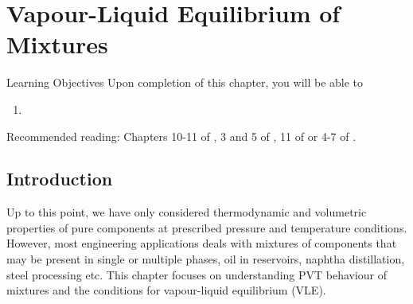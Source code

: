 \chapter{Vapour-Liquid Equilibrium of Mixtures}\label{Chapter:VLE}


   \begin{LearningObjectivesBlock}{Learning Objectives}
      Upon completion of this chapter, you will be able to
        \begin{enumerate}
           \item 
        \end{enumerate}
\medskip
     Recommended reading: Chapters 10-11 of \citet{SmithVanNess_Book}, 3 and 5 of \citet{Lue_Book}, 11 of \citet{Moran_Book} or 4-7 of \citet{Atkins_Book}.
   \end{LearningObjectivesBlock}


\begin{comment}
   \begin{LearningObjectivesBlock}{Learning Objectives}
      Upon completion of this chapter, you will be able to
        \begin{enumerate}
           \item {\bf Knowledge:} Define, Name, Select, State 
           \item {\bf Comprehension:} Describe, Identify, Discuss
           \item {\bf Application:} Apply, Demonstrate, Employ, Sketch
           \item {\bf Analysis:} Analyse, Compare, Calculate, Solve
           \item {\bf Synthesis:} Determine, Formulate
           \item {\bf Evaluation:} Assess, Check, Estimate, Compare, Measure, Monitor
        \end{enumerate}
\end{comment}

\localtableofcontents
   

\section{Introduction}\label{Chapter:VLE:Section:Introduction}
Up to this point, we have only considered thermodynamic and volumetric properties of pure components at prescribed pressure and temperature conditions. However, most engineering applications deals with mixtures of components that may be present in single or multiple phases, \eg oil in reservoirs, naphtha distillation, steel processing etc. This chapter focuses on understanding PVT behaviour of mixtures and the conditions for vapour-liquid equilibrium (VLE).



